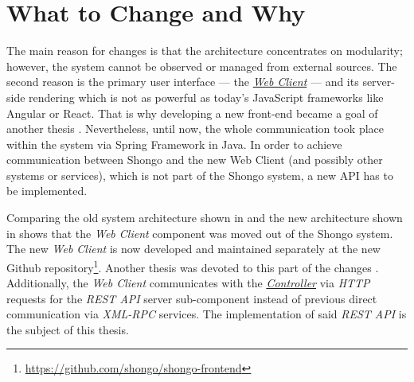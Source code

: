 \section{What to Change and Why}

The main reason for changes is that the architecture concentrates on modularity; however, the system cannot be observed or managed from external sources.
The second reason is the primary user interface --- the \hyperref[webclient]{\emph{Web Client}} --- and its server-side rendering which is not as powerful as today's JavaScript frameworks like Angular or React.
That is why developing a new front-end became a goal of another thesis \cite{drobnakm}.
Nevertheless, until now, the whole communication took place within the system via Spring Framework in Java. In order to achieve communication between Shongo and the new Web Client (and possibly other systems or services), which is not part of the Shongo system, a new API has to be implemented.


Comparing the old system architecture shown in  and the new architecture shown in  shows that the \emph{Web Client} component was moved out of the Shongo system. The new \emph{Web Client} is now developed and maintained separately at the new Github repository\footnote{\url{https://github.com/shongo/shongo-frontend}}. Another thesis was devoted to this part of the changes \cite{drobnakm}.
Additionally, the \emph{Web Client} communicates with the \hyperref[controller]{\emph{Controller}} via \emph{HTTP} requests for the \emph{REST API} server sub-component instead of previous direct communication via \emph{XML-RPC} services. The implementation of said \emph{REST API} is the subject of this thesis.
